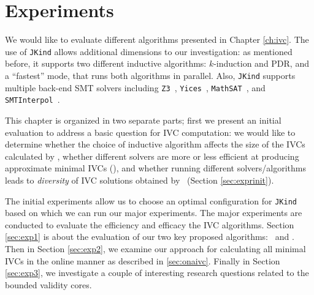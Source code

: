 \chapter{Experiments}
\label{ch:experiment}

\newcommand{\takeaway}[1]{
\vspace{12pt}
\noindent\fbox{\parbox{\textwidth}{#1}}
\vspace{6pt}
}
We would like to evaluate different algorithms presented in Chapter \ref{ch:ivc}.
 The use of \texttt{JKind} allows additional dimensions to our investigation: as mentioned before, it supports two different inductive algorithms: $k$-induction and PDR, and a ``fastest'' mode, that runs both algorithms in parallel.  Also, \texttt{JKind} supports multiple back-end SMT solvers including \texttt{Z3}~\cite{DeMoura08:z3}, \texttt{Yices}~\cite{Dutertre06:yices}, \texttt{MathSAT}~\cite{Cimatti2013:MathSAT}, and \texttt{SMTInterpol}~\cite{Christ2012:SMTInterpol}.

 This chapter is organized in two separate parts; first we present an initial evaluation to address a basic question for IVC computation: we would like to determine whether the choice of inductive algorithm affects the size of the IVCs calculated by \ucalg , whether different solvers are more or less efficient at producing approximate minimal IVCs (\ucalg), and whether running different solvers/algorithms leads to {\em diversity} of IVC solutions obtained by \ucalg\ (Section \ref{sec:exprinit}).

The initial experiments allow us to choose an optimal configuration for \texttt{JKind} based on which we can run our major experiments. The major experiments are conducted to evaluate the efficiency and efficacy the IVC algorithms. Section \ref{sec:exp1} is about the evaluation of our two key proposed algorithms: \ucalg\ and \aivcalg . Then in Section \ref{sec:exp2}, we examine our approach for calculating all minimal IVCs in the online manner as described in \ref{sec:onaivc}. Finally in Section \ref{sec:exp3}, we investigate a couple of interesting research questions related to the bounded validity cores.

